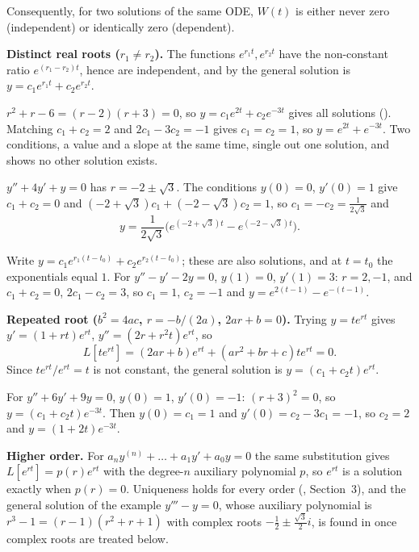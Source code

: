 \documentclass[10pt]{scrartcl}
\begin{document}
Consequently, for two solutions of the same ODE, $W(t)$ is either never zero (independent) or identically zero (dependent).

\noindent\textbf{Distinct real roots ($r_1\neq r_2$).} The functions $e^{r_1 t},e^{r_2 t}$ have the non-constant ratio $e^{(r_1-r_2)t}$, hence are independent, and by  the general solution is $y=c_1e^{r_1 t}+c_2e^{r_2 t}$.

\revisit $r^2+r-6=(r-2)(r+3)=0$, so $y=c_1e^{2t}+c_2e^{-3t}$ gives all solutions (). Matching $c_1+c_2=2$ and $2c_1-3c_2=-1$ gives $c_1=c_2=1$, so $y=e^{2t}+e^{-3t}$. Two conditions, a value and a slope at the same time, single out one solution, and  shows no other solution exists.

\begin{example*}
  $y''+4y'+y=0$ has $r=-2\pm\sqrt{3}$. The conditions $y(0)=0$, $y'(0)=1$ give $c_1+c_2=0$ and $(-2+\sqrt3)c_1+(-2-\sqrt3)c_2=1$, so $c_1=-c_2=\frac{1}{2\sqrt3}$ and
  \[
    y=\frac{1}{2\sqrt{3}}\bigl(e^{(-2+\sqrt{3})t}-e^{(-2-\sqrt{3})t}\bigr).
  \]
\end{example*}

\begin{example*}
  Write $y=c_1e^{r_1(t-t_0)}+c_2e^{r_2(t-t_0)}$; these are also solutions, and at $t=t_0$ the exponentials equal $1$. For $y''-y'-2y=0$, $y(1)=0$, $y'(1)=3$: $r=2,-1$, and $c_1+c_2=0$, $2c_1-c_2=3$, so $c_1=1$, $c_2=-1$ and $y=e^{2(t-1)}-e^{-(t-1)}$.
\end{example*}

\noindent\textbf{Repeated root ($b^2=4ac$, $r=-b/(2a)$, $2ar+b=0$).} Trying $y=te^{rt}$ gives $y'=(1+rt)e^{rt}$, $y''=(2r+r^2t)e^{rt}$, so
\[
  L[te^{rt}]=(2ar+b)e^{rt}+(ar^2+br+c)te^{rt}=0.
\]
Since $te^{rt}/e^{rt}=t$ is not constant, the general solution is $y=(c_1+c_2t)e^{rt}$.

\begin{example*}
  For $y''+6y'+9y=0$, $y(0)=1$, $y'(0)=-1$: $(r+3)^2=0$, so $y=(c_1+c_2t)e^{-3t}$. Then $y(0)=c_1=1$ and $y'(0)=c_2-3c_1=-1$, so $c_2=2$ and $y=(1+2t)e^{-3t}$.
\end{example*}

\noindent\textbf{Higher order.} For $a_ny^{(n)}+\dots+a_1y'+a_0y=0$ the same substitution gives $L[e^{rt}]=p(r)e^{rt}$ with the degree-$n$ auxiliary polynomial $p$, so $e^{rt}$ is a solution exactly when $p(r)=0$. Uniqueness holds for every order (, Section~3), and the general solution of the example $y'''-y=0$, whose auxiliary polynomial is $r^3-1=(r-1)(r^2+r+1)$ with complex roots $-\frac12\pm\frac{\sqrt{3}}{2}i$, is found in  once complex roots are treated below.
\end{document}
